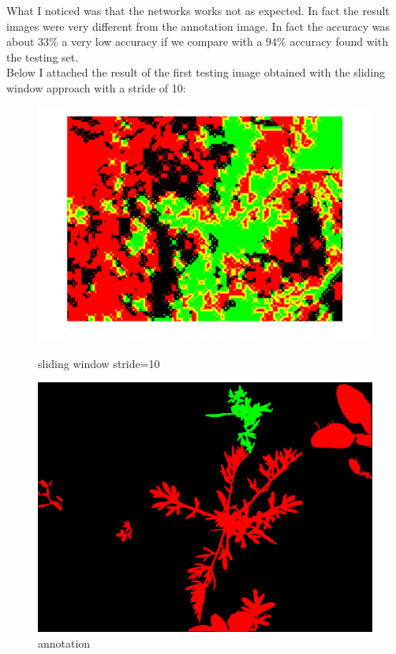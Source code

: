 \documentclass[]{report}
\begin{document}
What I noticed was that the networks works not as expected. In fact the result images were very different from the annotation image. In fact the accuracy was about $ 33\% $ a very low accuracy if we compare with a $ 94\% $ accuracy found with the testing set.\\
Below I attached the result of the first testing image obtained with the sliding window approach with a stride of 10:

\begin{figure}[!htb]
  \includegraphics[width=\linewidth]{stride10im1.png}
  \caption{sliding window stride=10}\label{fig: sliding window problem}
\endminipage\hfill
{}
  \includegraphics[width=\linewidth]{annotation.png}
  \caption{annotation}\label{fig:annotation}
\endminipage\hfill
\end{figure}
\newpage
\end{document}
